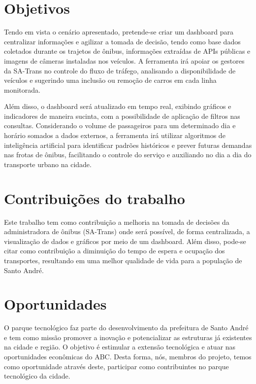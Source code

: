 \section{Objetivos}
\indent
\par Tendo em vista o cenário apresentado, pretende-se criar um dashboard para centralizar informações e agilizar a tomada de decisão, tendo como base dados coletados durante os trajetos de ônibus, informações extraídas de APIs públicas e imagens de câmeras instaladas nos veículos. A ferramenta irá apoiar os gestores da SA-Trans no controle do fluxo de tráfego, analisando a disponibilidade de veículos e sugerindo uma inclusão ou remoção de carros em cada linha monitorada.
\par Além disso, o dashboard será atualizado em tempo real, exibindo gráficos e indicadores de maneira sucinta, com a possibilidade de aplicação de filtros nas consultas. Considerando o volume de passageiros para um determinado dia e horário somados a dados externos, a ferramenta irá utilizar algoritmos de inteligência artificial para identificar padrões históricos e prever futuras demandas nas frotas de ônibus, facilitando o controle do serviço e auxiliando no dia a dia do transporte urbano na cidade.


\section{Contribuições do trabalho}
\indent
\par Este trabalho tem como contribuição a melhoria na tomada de decisões da administradora de ônibus (SA-Trans) onde será possível, de forma centralizada, a visualização de dados e gráficos por meio de um dashboard. Além disso, pode-se citar como contribuição a diminuição do tempo de espera e ocupação dos transportes, resultando em uma melhor qualidade de vida para a população de Santo André.

\section{Oportunidades}
\indent
\par O parque tecnológico faz parte do desenvolvimento da prefeitura de Santo André e tem como missão promover a inovação e potencializar as estruturas já existentes na cidade e região. O objetivo é estimular a extensão tecnológica e atuar nas oportunidades econômicas do ABC.
Desta forma, nós, membros do projeto, temos como oportunidade através deste, participar como contribuintes no parque tecnológico da cidade.

